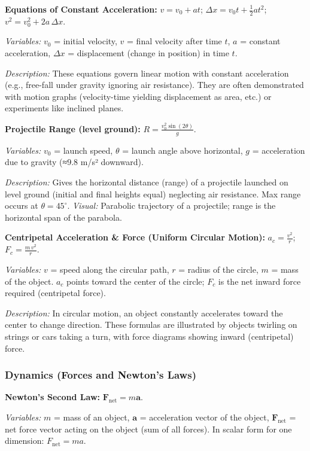 \documentclass{article}
\begin{document}
\textbf{Equations of Constant Acceleration:} $v = v_0 + a t$; $\displaystyle \Delta x = v_0 t + \tfrac{1}{2}a t^2$; $v^2 = v_0^2 + 2a\,\Delta x$.

\textit{Variables:} $v_0$ = initial velocity, $v$ = final velocity after time $t$, $a$ = constant acceleration, $\Delta x$ = displacement (change in position) in time $t$.

\textit{Description:} These equations govern linear motion with constant acceleration (e.g., free-fall under gravity ignoring air resistance). They are often demonstrated with motion graphs (velocity-time yielding displacement as area, etc.) or experiments like inclined planes.

\textbf{Projectile Range (level ground):} $R = \frac{v_0^2 \sin(2\theta)}{g}$.

\textit{Variables:} $v_0$ = launch speed, $\theta$ = launch angle above horizontal, $g$ = acceleration due to gravity (≈9.8 m/s² downward).

\textit{Description:} Gives the horizontal distance (range) of a projectile launched on level ground (initial and final heights equal) neglecting air resistance. Max range occurs at $\theta=45^\circ$. \textit{Visual:} Parabolic trajectory of a projectile; range is the horizontal span of the parabola.

\textbf{Centripetal Acceleration \& Force (Uniform Circular Motion):} $a_c = \frac{v^2}{r}$;  $F_c = \frac{m\,v^2}{r}$.

\textit{Variables:} $v$ = speed along the circular path, $r$ = radius of the circle, $m$ = mass of the object. $a_c$ points toward the center of the circle; $F_c$ is the net inward force required (centripetal force).

\textit{Description:} In circular motion, an object constantly accelerates toward the center to change direction. These formulas are illustrated by objects twirling on strings or cars taking a turn, with force diagrams showing inward (centripetal) force.

\subsubsection*{Dynamics (Forces and Newton's Laws)}

\textbf{Newton’s Second Law:} $\mathbf{F}_{\text{net}} = m \mathbf{a}$.

\textit{Variables:} $m$ = mass of an object, $\mathbf{a}$ = acceleration vector of the object, $\mathbf{F}_{\text{net}}$ = net force vector acting on the object (sum of all forces). In scalar form for one dimension: $F_{\text{net}} = m a$.
\end{document}
